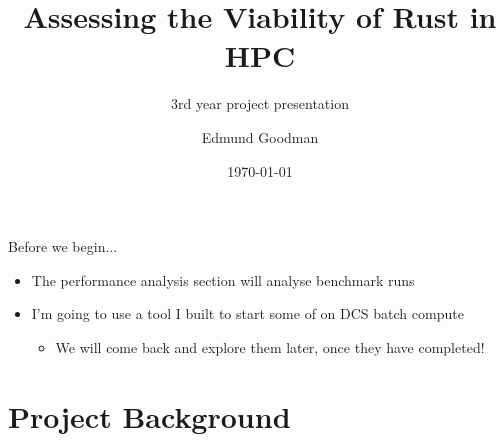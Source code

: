 \documentclass[10pt,aspectratio=169]{beamer}
\title{Assessing the Viability of Rust in HPC}
\subtitle{3rd year project presentation}
\author{Edmund Goodman}
\date{\today}
\begin{document}
\maketitle


\begin{frame}{Before we begin...}
\begin{itemize}
    \item The performance analysis section will analyse benchmark runs
    \vspace*{0.5cm}
    \item I'm going to use a tool I built to start some of on DCS batch compute
    \begin{itemize}
        \item \alert{We will come back and explore them later, once they have completed!}
    \end{itemize}
\end{itemize}
\end{frame}

\section{Project Background}
\end{document}
